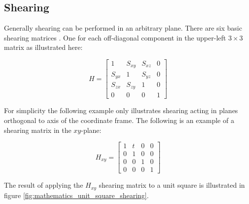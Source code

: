 \subsection*{Shearing}
\label{sec:basic_math_shearing}
Generally shearing can be performed
in an arbitrary plane. There are six basic shearing matrices
. One for each 
off-diagonal component in the upper-left $3\times3$ matrix as
illustrated here:
 
\begin{equation}
\label{eq:shearing_matrix}
H = 
\begin{bmatrix} 
1 & S_{xy} & S_{xz} & 0 \\ 
S_{yx} & 1 & S_{yz} & 0 \\ 
S_{zx} & S_{zy} & 1 & 0\\
0 & 0 & 0 & 1 
\end{bmatrix} 
\end{equation} 

For simplicity the following example only illustrates
shearing acting in planes orthogonal to axis of the coordinate
frame. The following is an example of a shearing matrix in the
$xy$-plane: 

\begin{equation}
\label{eq:shearing_matrix_xy_plane}
H_{xy} = 
\begin{bmatrix} 
1 & t & 0 & 0 \\ 
0 & 1 & 0 & 0 \\ 
0 & 0 & 1 & 0\\
0 & 0 & 0 & 1 
\end{bmatrix} 
\end{equation} 

The result of applying the $H_{xy}$ shearing matrix to a unit square is
illustrated in figure \vref{fig:mathematics_unit_square_shearing}.


